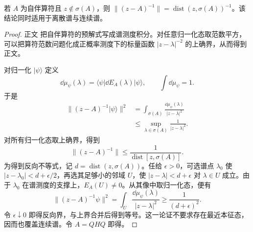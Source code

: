 \begin{theorem}[自伴预解式的精确范数]
若 $A$ 为自伴算符且 $z\notin\sigma(A)$，则 $\|(z-A)^{-1}\|=\operatorname{dist}(z,\sigma(A))^{-1}$。该结论同时适用于离散谱与连续谱。
\end{theorem}
\begin{proof}
正文 把自伴算符的预解式写成谱测度积分。对任意归一化态取范数平方，可以把算符范数问题化成正概率测度下的标量函数 $|z-\lambda|^{-2}$ 的上确界，从而得到正文。

对归一化 $|\psi\rangle$ 定义
\begin{equation*}
 \dd\mu_\psi(\lambda)
 =\langle\psi|\dd E_A(\lambda)|\psi\rangle,
 \qquad
 \int\dd\mu_\psi=1.
\end{equation*}
于是
\begin{align*}
 \|(z-A)^{-1}|\psi\rangle\|^2
 &=\int_{\sigma(A)}
 \frac{\dd\mu_\psi(\lambda)}{|z-\lambda|^2}\\
 &\le
 \sup_{\lambda\in\sigma(A)}\frac1{|z-\lambda|^2}.
\end{align*}
对所有归一化态取上确界，得到
\begin{equation*}
 \|(z-A)^{-1}\|
 \le\frac1{\operatorname{dist}[z,\sigma(A)]}.
\end{equation*}
为得到反向不等式，记 $d=\operatorname{dist}(z,\sigma(A))$。任给 $\epsilon>0$，可选谱点 $\lambda_0$ 使 $|z-\lambda_0|<d+\epsilon/2$，再选其足够小的邻域 $U$，使 $|z-\lambda|<d+\epsilon$ 对 $\lambda\in U$ 成立。由于 $\lambda_0$ 在谱测度的支撑上，$E_A(U)\ne0$。从其像中取归一化态，便有
\[
 \|(z-A)^{-1}\psi\|^2
 =\int_U\frac{\dd\mu_\psi(\lambda)}{|z-\lambda|^2}
 \ge\frac1{(d+\epsilon)^2}.
\]
令 $\epsilon\downarrow0$ 即得反向界，与上界合并后得到等号。这一论证不要求存在最近本征态，因而也覆盖连续谱。令 $A=QHQ$ 即得。
\end{proof}

